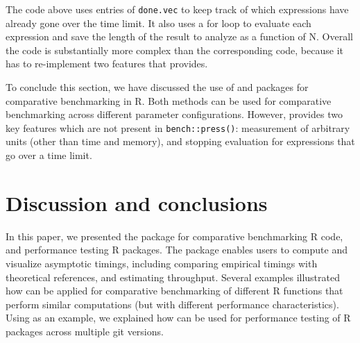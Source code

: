 \begin{Schunk}
\end{Schunk}
The code above uses entries of \verb|done.vec| to keep track of which expressions have already gone over the time limit.
It also uses a for loop to evaluate each expression and save the length of the result to analyze as a function of N.
Overall the code is substantially more complex than the corresponding  code, because it has to re-implement two features that  provides.

To conclude this section, we have discussed the use of  and  packages for comparative benchmarking in R. 
Both methods can be used for comparative benchmarking across different parameter configurations. 
However,  provides two key features which are not present in \verb|bench::press()|: measurement of arbitrary units (other than time and memory), and stopping evaluation for expressions that go over a time limit.

\section{Discussion and conclusions}

In this paper, we presented the  package for comparative benchmarking R code, and performance testing R packages. 
The  package enables users to compute and visualize asymptotic timings, including comparing empirical timings with theoretical references, and estimating throughput.
Several examples illustrated how  can be applied for comparative benchmarking of different R functions that perform similar computations (but with different performance characteristics).
Using  as an example, we explained how  can be used for performance testing of R packages across multiple git versions. 

